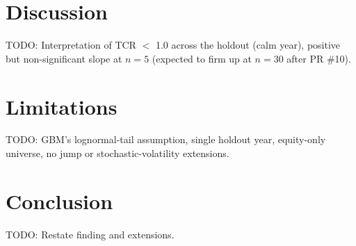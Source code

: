 \documentclass[11pt,a4paper]{article}
\begin{document}
\section{Discussion}\label{sec:discussion}
TODO: Interpretation of TCR $<$ 1.0 across the holdout (calm year), positive but
non-significant slope at $n=5$ (expected to firm up at $n=30$ after PR \#10).

\section{Limitations}\label{sec:limitations}
TODO: GBM's lognormal-tail assumption, single holdout year, equity-only universe,
no jump or stochastic-volatility extensions.

\section{Conclusion}\label{sec:conclusion}
TODO: Restate finding and extensions.



\end{document}
